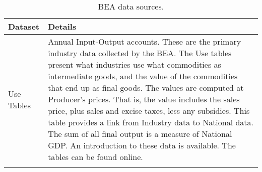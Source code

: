\begin{table}
\caption[BEA data sources]{BEA data sources.}
\begin{center}

         

  \begin{tabular}{l @{\hspace{2em}} p{10cm}}
   \toprule 
    Dataset & Details  \\ 

	\midrule
Use Tables & Annual Input-Output accounts. 
	These are the primary industry data collected by the BEA\@.
	The Use tables present what industries use what commodities 
	as intermediate goods, and the value of the commodities that end up as final goods. 
	The values are computed at Producer’s prices. 
	That is, the value includes the sales price, plus sales and excise taxes, 
	less any subsidies. 
	This table provides a link from Industry data to National data. 
	The sum of all final output is a measure of National GDP\@.
	An introduction to these data is available.\cite{Streitwieser:2011aa}
	The tables can be found online.\cite{BEAIOData}\\
 & \\


\end{tabular}
\end{center}
\end{table}
